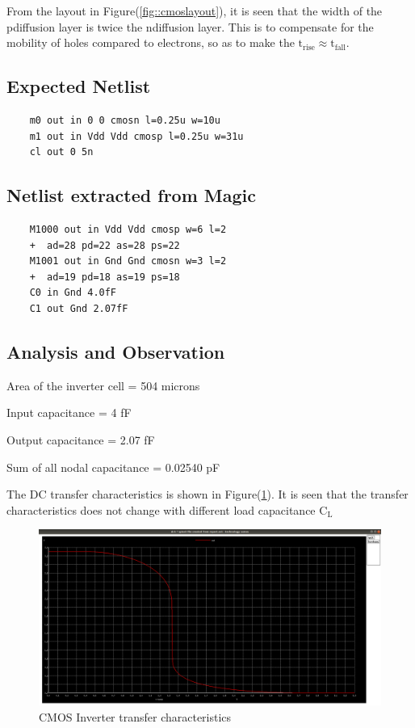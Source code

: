 \documentclass[12pt, a4paper]{article}
\begin{document}
	From the layout in Figure(\ref{fig::cmoslayout}), it is seen that the width of the pdiffusion layer is twice the ndiffusion layer. This is to compensate for the mobility of holes compared to electrons, so as to make the $\text{t}_\text{rise} \approx \text{t}_\text{fall}$.
	\subsection{Expected Netlist}
	\begin{lstlisting}
	m0 out in 0 0 cmosn l=0.25u w=10u
	m1 out in Vdd Vdd cmosp l=0.25u w=31u
	cl out 0 5n
	\end{lstlisting}
	\subsection{Netlist extracted from Magic}
	\begin{lstlisting}
	M1000 out in Vdd Vdd cmosp w=6 l=2
	+  ad=28 pd=22 as=28 ps=22
	M1001 out in Gnd Gnd cmosn w=3 l=2
	+  ad=19 pd=18 as=19 ps=18
	C0 in Gnd 4.0fF
	C1 out Gnd 2.07fF
	\end{lstlisting}
	
	\subsection{Analysis and Observation}
	Area of the inverter cell = 504 microns 
	\par Input capacitance = 4 fF
	\par Output capacitance = 2.07 fF
	\par Sum of all nodal capacitance = 0.02540 pF
	
	The DC transfer characteristics is shown in Figure(\ref{fig::layout_dc}). It is seen that the transfer characteristics does not change  with different load capacitance $\text{C}_\text{L}$ 
	\begin{figure}[H]
		\begin{center}
			\includegraphics[scale = 0.18]{images/layout_dc.png}
			\caption{CMOS Inverter transfer characteristics}
			\label{fig::layout_dc}
		\end{center}
	\end{figure}
	
\end{document}
